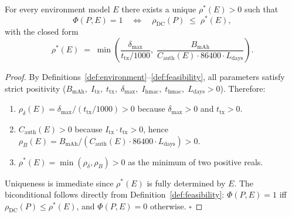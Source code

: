 \begin{theorem}
\label{thm:feasibility-bound}
For every environment model $E$ there exists a unique $\rho^*(E) > 0$
such that
\[
  \Phi(P, E) = 1
  \quad \Longleftrightarrow \quad
  \rho_{\mathrm{DC}}(P) \;\le\; \rho^*(E),
\]
with the closed form
\[
  \rho^*(E) \;=\;
  \min\!\left(
    \frac{\delta_{\max}}{t_{\mathrm{tx}}/1000},\;
    \frac{B_{\mathrm{mAh}}}{C_{\mathrm{auth}}(E) \cdot 86400 \cdot L_{\mathrm{days}}}
  \right).
\]
\end{theorem}

\begin{proof}
By Definitions~\ref{def:environment}--\ref{def:feasibility}, all
parameters satisfy strict positivity ($B_{\mathrm{mAh}},\;
I_{\mathrm{tx}},\; t_{\mathrm{tx}},\; \delta_{\max},\;
I_{\mathrm{hmac}},\; t_{\mathrm{hmac}},\; L_{\mathrm{days}} > 0$).
Therefore:
\begin{enumerate}[label=(\roman*)]
  \item $\rho_{\delta}(E) = \delta_{\max}/(t_{\mathrm{tx}}/1000) > 0$
        because $\delta_{\max} > 0$ and $t_{\mathrm{tx}} > 0$.

  \item $C_{\mathrm{auth}}(E) > 0$ because
        $I_{\mathrm{tx}} \cdot t_{\mathrm{tx}} > 0$, hence
        $\rho_{B}(E) = B_{\mathrm{mAh}} /
        (C_{\mathrm{auth}}(E) \cdot 86400 \cdot L_{\mathrm{days}}) > 0$.

  \item $\rho^*(E) = \min(\rho_{\delta}, \rho_{B}) > 0$ as the minimum
        of two positive reals.
\end{enumerate}
Uniqueness is immediate since $\rho^*(E)$ is fully determined by $E$.
The biconditional follows directly from Definition~\ref{def:feasibility}:
$\Phi(P, E) = 1$ iff $\rho_{\mathrm{DC}}(P) \le \rho^*(E)$, and
$\Phi(P, E) = 0$ otherwise.
\hfill$\square$
\end{proof}

